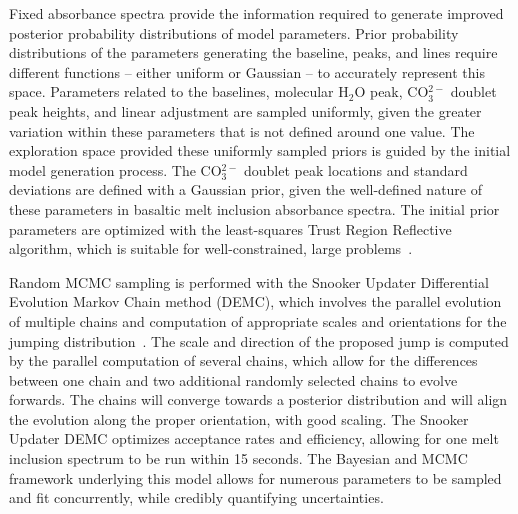 \documentclass[draft]{agujournal2019}
\begin{document}
Fixed absorbance spectra provide the information required to generate improved posterior probability distributions of model parameters. Prior probability distributions of the parameters generating the baseline, peaks, and lines require different functions – either uniform or Gaussian – to accurately represent this space. Parameters related to the baselines, molecular H$_{2}$O peak, CO$_{3}^{2-}$ doublet peak heights, and linear adjustment are sampled uniformly, given the greater variation within these parameters that is not defined around one value. The exploration space provided these uniformly sampled priors is guided by the initial model generation process. The CO$_{3}^{2-}$ doublet peak locations and standard deviations are defined with a Gaussian prior, given the well-defined nature of these parameters in basaltic melt inclusion absorbance spectra. The initial prior parameters are optimized with the least-squares Trust Region Reflective algorithm, which is suitable for well-constrained, large problems~\cite{Branchetal1999}. 

Random MCMC sampling is performed with the Snooker Updater Differential Evolution Markov Chain method (DEMC), which involves the parallel evolution of multiple chains and computation of appropriate scales and orientations for the jumping distribution~\cite{terBraak2006, terBraakandVrugt2008}. The scale and direction of the proposed jump is computed by the parallel computation of several chains, which allow for the differences between one chain and two additional randomly selected chains to evolve forwards. The chains will converge towards a posterior distribution and will align the evolution along the proper orientation, with good scaling. The Snooker Updater DEMC optimizes acceptance rates and efficiency, allowing for one melt inclusion spectrum to be run within 15 seconds. The Bayesian and MCMC framework underlying this model allows for numerous parameters to be sampled and fit concurrently, while credibly quantifying uncertainties. 



\end{document}
